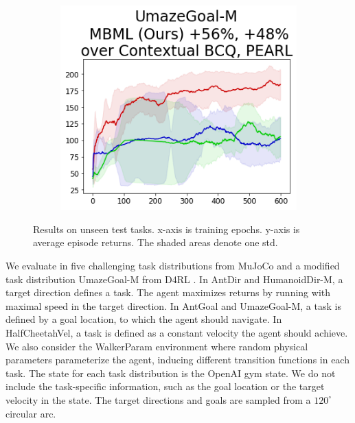 \begin{figure}[!t]
\begin{minipage}{0.69\textwidth}
{            \begin{subfigure}{\mujocobaselinefigsize\paperwidth}
                \includegraphics[width=\linewidth]{chapter_2/fig/wd-UmazeGoal-M.png}
            \end{subfigure}}

    \end{minipage}
    \caption{Results on unseen test tasks.
        x-axis is training epochs.
        y-axis is average episode returns.
        The shaded areas denote one std.
    }\label{fig:testing_performance}
\end{figure}

We evaluate in five challenging task distributions from MuJoCo \cite{todorov2012mujoco} and a modified task distribution UmazeGoal-M from D4RL \cite{fu2020d4rl}. In AntDir and HumanoidDir-M, a target direction defines a task. The agent maximizes returns by running with maximal speed in the target direction. In AntGoal and UmazeGoal-M, a task is defined by a goal location, to which the agent should navigate. In HalfCheetahVel, a task is defined as a constant velocity the agent should achieve. We also consider the WalkerParam environment where random physical parameters parameterize the agent, inducing different transition functions in each task. The state for each task distribution is the OpenAI gym state. We do not include the task-specific information, such as the goal location or the target velocity in the state. The target directions and goals are sampled from a $120^{\circ}$ circular arc.

